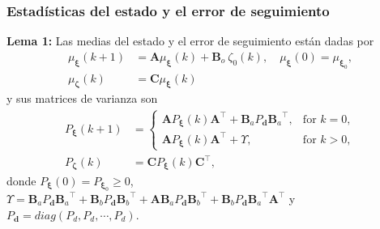 \documentclass[aspectratio=169,dvipsnames]{beamer}
\begin{document}
\begin{frame}{}
\frametitle{Estadísticas del estado y el error de seguimiento}
\vspace{3mm}
\begin{mybox}{}
{\bf Lema 1:} Las medias del estado y el error de seguimiento están dadas por 
\begin{subequations} \label{eq:means_all}
\begin{align}
    \label{eq:mu_xi_all}
    \mu_{\bm{\xi}}(k+1) &= \mathbf{A} \mu_{\bm{\xi}}(k) +\mathbf{B}_o\ \zeta_0(k), \quad \mu_{\bm{\xi}}(0)=\mu_{\bm{\xi}_0}, \\
        \label{eq:mu_z_all}
    \mu_{\bm{\zeta}}(k) &=
        \mathbf{C} \mu_{\bm{\xi}}(k)
\end{align}	  
\end{subequations}
y sus matrices de varianza son
\begin{subequations} \label{eq:variance_all}
\begin{align} 
    \label{eq:P_xi_all}
    P_{\bm{\xi}}(k+1) &=
    \begin{cases}
        \mathbf{A} P_{\bm{\xi}}(k)\mathbf{A}^\top + \mathbf{B}_a P_{\bm{d}} {\mathbf{B}_a}^\top,  & \text{for } k=0, \\
        \mathbf{A} P_{\bm{\xi}}(k)\mathbf{A}^\top + \Upsilon, & \text{for } k>0,
    \end{cases} \\
    \label{eq:P_z_all}
    P_{\bm{\zeta}}(k) &=
        \mathbf{C} P_{\bm{\xi}}(k)\mathbf{C}^\top,
\end{align}
\end{subequations}
donde $P_{\bm{\xi}}(0) = P_{\bm{\xi}_0} \geq 0$, $\Upsilon = \mathbf{B}_{a} P_{\mathbf{d}} {\mathbf{B}_{a}}^\top + \mathbf{B}_{b} P_{\mathbf{d}} {\mathbf{B}_{b}}^\top + \mathbf{A}\mathbf{B}_{a} P_{\mathbf{d}} {\mathbf{B}_{b}}^\top + \mathbf{B}_{b} P_{\mathbf{d}} {\mathbf{B}_{a}}^\top \mathbf{A}^{\top}$ y $P_{\bm{d}}=diag(P_d,P_d,\cdots,P_d)$. 
\end{mybox}
\end{frame}
\end{document}
